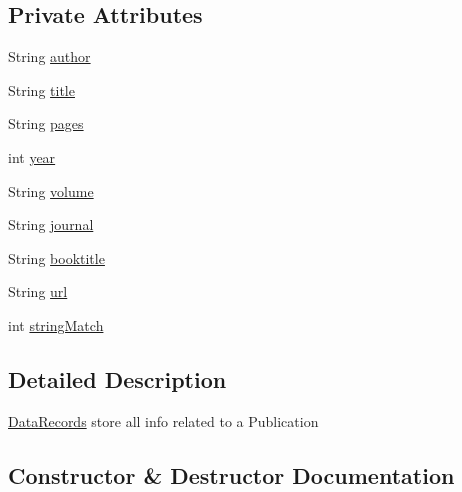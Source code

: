 \subsection*{Private Attributes}
\begin{DoxyCompactItemize}
\item 
String \hyperlink{classDataRecords_a16230e6e4a7ff8947225b5336f34b727}{author}
\item 
String \hyperlink{classDataRecords_a0d2a944285b7168f1cc61f2173a3892b}{title}
\item 
String \hyperlink{classDataRecords_ad4ecb52d88a34679b11d9473acfca9f7}{pages}
\item 
int \hyperlink{classDataRecords_ad7124e534dcce1adc70799071c64e431}{year}
\item 
String \hyperlink{classDataRecords_a9def6bcb60fe42b44e052ebd5d499ac4}{volume}
\item 
String \hyperlink{classDataRecords_a89f32013b5ffe93fe421f7ad37534086}{journal}
\item 
String \hyperlink{classDataRecords_ad43b933314b398e13701deb18add0d49}{booktitle}
\item 
String \hyperlink{classDataRecords_a220ad19762fcd3d7eb0c7da32a75ab39}{url}
\item 
int \hyperlink{classDataRecords_a45d9849a7089e7461c8e5568ee0cac20}{string\+Match}
\end{DoxyCompactItemize}


\subsection{Detailed Description}
\hyperlink{classDataRecords}{Data\+Records} store all info related to a Publication 

\subsection{Constructor \& Destructor Documentation}
